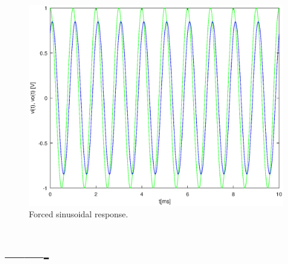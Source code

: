 \begin{figure}[h] \centering
\includegraphics[width=0.8\linewidth]{forced.eps}
\caption{Forced sinusoidal response.}
\label{fig:forced}
\end{figure}

\section{-------}

